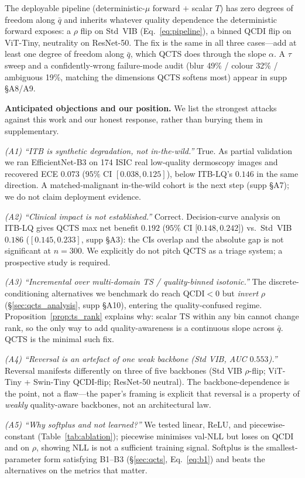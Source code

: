 \documentclass{bmvc2k}
\begin{document}
The deployable pipeline (deterministic-$\mu$ forward $+$ scalar $T$) has zero degrees of freedom along $\bar q$ and inherits whatever quality dependence the deterministic forward exposes: a $\rho$ flip on Std~VIB (Eq.~\ref{eq:pipeline}), a binned QCDI flip on ViT-Tiny, neutrality on ResNet-50. The fix is the same in all three cases---add at least one degree of freedom along $\bar q$, which QCTS does through the slope $\alpha$. A $\tau$ sweep and a confidently-wrong failure-mode audit (blur 49\% / colour 32\% / ambiguous 19\%, matching the dimensions QCTS softens most) appear in supp \S A8/A9.

\textbf{Anticipated objections and our position.}
We list the strongest attacks against this work and our honest response, rather than burying them in supplementary.

\emph{(A1) ``ITB is synthetic degradation, not in-the-wild.''}
True. As partial validation we ran EfficientNet-B3 on 174 ISIC real low-quality dermoscopy images and recovered ECE $0.073$ ($95\%$ CI $[0.038, 0.125]$), below ITB-LQ's $0.146$ in the same direction. A matched-malignant in-the-wild cohort is the next step (supp \S A7); we do not claim deployment evidence.

\emph{(A2) ``Clinical impact is not established.''}
Correct. Decision-curve analysis on ITB-LQ gives QCTS max net benefit $0.192$ ($95\%$ CI $[0.148, 0.242$]) vs.\ Std~VIB $0.186$ ($[0.145, 0.233]$, supp \S A3): the CIs overlap and the absolute gap is not significant at $n{=}300$. We explicitly do not pitch QCTS as a triage system; a prospective study is required.

\emph{(A3) ``Incremental over multi-domain TS / quality-binned isotonic.''}
The discrete-conditioning alternatives we benchmark do reach QCDI${<}0$ but \emph{invert} $\rho$ (\S\ref{sec:qcts_analysis}, supp \S A10), entering the quality-confused regime. Proposition~\ref{prop:ts_rank} explains why: scalar TS within any bin cannot change rank, so the only way to add quality-awareness is a continuous slope across $\bar q$. QCTS is the minimal such fix.

\emph{(A4) ``Reversal is an artefact of one weak backbone (Std VIB, AUC $0.553$).''}
Reversal manifests differently on three of five backbones (Std VIB $\rho$-flip; ViT-Tiny + Swin-Tiny QCDI-flip; ResNet-50 neutral). The backbone-dependence is the point, not a flaw---the paper's framing is explicit that reversal is a property of \emph{weakly} quality-aware backbones, not an architectural law.

\emph{(A5) ``Why softplus and not learned?''}
We tested linear, ReLU, and piecewise-constant (Table~\ref{tab:ablation}); piecewise minimises val-NLL but loses on QCDI and on $\rho$, showing NLL is not a sufficient training signal. Softplus is the smallest-parameter form satisfying B1--B3 (\S\ref{sec:qcts}, Eq.~\ref{eq:b1}) and beats the alternatives on the metrics that matter.
\end{document}

